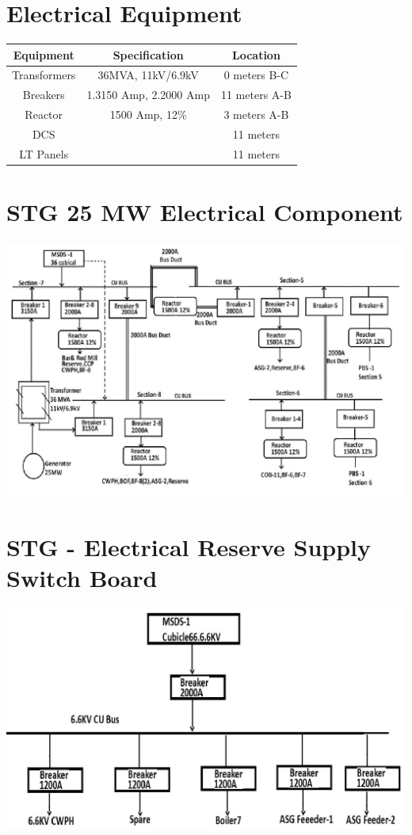 \documentclass[english,11pt]{report}
\begin{document}
\section{Electrical Equipment}
\begin{center}
\begin{tabular} { | c | c | c |} 
\hline
Equipment & Specification & Location \\ \hline
Transformers & 36MVA, 11kV/6.9kV & 0 meters B-C \\ \hline
Breakers & 1.3150 Amp, 2.2000 Amp & 11 meters A-B \\ \hline
Reactor & 1500 Amp, 12\% & 3 meters A-B \\ \hline
DCS &  & 11 meters \\ \hline
LT Panels & & 11 meters\\  
\hline
\end{tabular}
\end{center}
\section{STG 25 MW Electrical Component}
\includegraphics[width =6in]{stg25mw}
\section{STG - Electrical Reserve Supply Switch Board}
\includegraphics[width =6in]{stgelec}   
\end{document}
